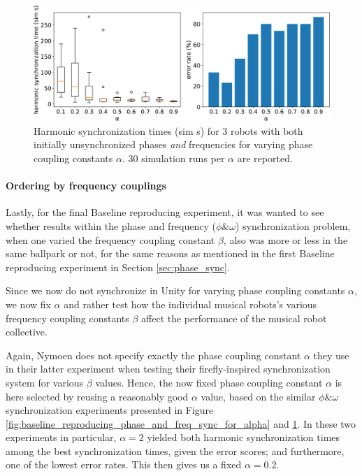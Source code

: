 		\begin{figure}[ht!]
			\centering
			\includegraphics[width=\linewidth]{Assets/DocSegments/Chapters/ExperimentsAndResults/Figures/PerfScores/stable_baseline_reproducing_phase_and_freq_sync_for_alpha.pdf}
			\caption{Harmonic synchronization times (sim s) for 3 robots with both initially unsynchronized phases \textit{and} frequencies for varying phase coupling constants $\alpha$. 30 simulation runs per $\alpha$ are reported.}
			\label{fig:stable_baseline_reproducing_phase_and_freq_sync_for_alpha}
		\end{figure}
		
	
		\paragraph{Ordering by frequency couplings}
		
		Lastly, for the final Baseline reproducing experiment, it was wanted to see whether results within the phase and frequency ($\phi\&\omega$) synchronization problem, when one varied the frequency coupling constant $\beta$, also was more or less in the same ballpark or not, for the same reasons as mentioned in the first Baseline reproducing experiment in Section \ref{sec:phase_sync}.
		
		Since we now do not synchronize in Unity for varying phase coupling constants $\alpha$, we now fix $\alpha$ and rather test how the individual musical robots's various frequency coupling constants $\beta$ affect the performance of the musical robot collective.
		
		Again, Nymoen does not specify exactly the phase coupling constant $\alpha$ they use in their latter experiment when testing their firefly-inspired synchronization system for various $\beta$ values. Hence, the now fixed phase coupling constant $\alpha$ is here selected by reusing a reasonably good $\alpha$ value, based on the similar $\phi\&\omega$ synchronization experiments presented in Figure \ref{fig:baseline_reproducing_phase_and_freq_sync_for_alpha} and \ref{fig:stable_baseline_reproducing_phase_and_freq_sync_for_alpha}. In these two experiments in particular, $\alpha=2$ yielded both harmonic synchronization times among the best synchronization times, given the error scores; and furthermore, one of the lowest error rates. This then gives us a fixed $\alpha = 0.2$.
		
